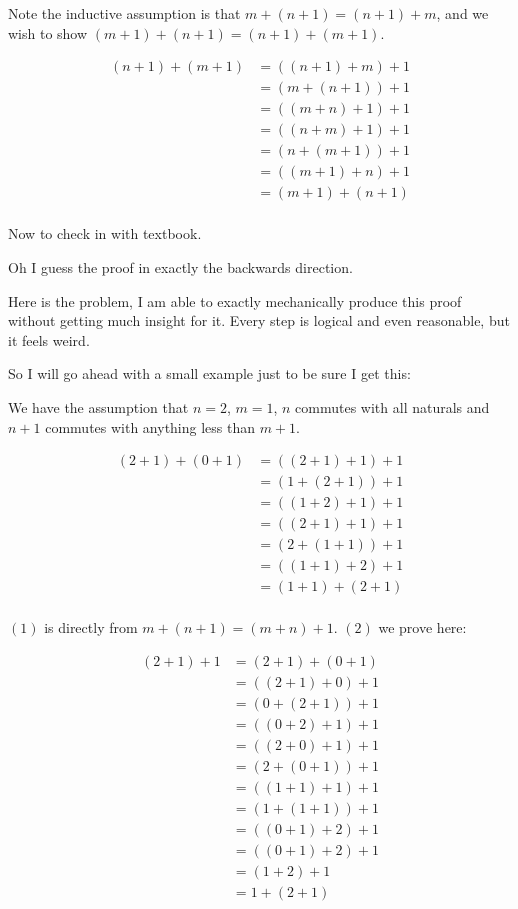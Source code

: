 \documentclass{article}
\begin{document}
\begin{enumerate}
Note the inductive assumption is that $m + (n + 1) = (n + 1) + m$, and we wish to show $(m + 1) + (n + 1) = (n + 1) + (m + 1)$.

\begin{align*}
	(n + 1) + (m + 1) &= ((n + 1) + m) + 1\\
	&= (m + (n + 1)) + 1\\
	&= ((m + n) + 1) + 1\\
	&= ((n + m) + 1) + 1\\
	&= (n + (m + 1)) + 1\\
	&= ((m + 1) + n) + 1\\
	&= (m + 1) + (n + 1)\\
\end{align*}

Now to check in with textbook.

Oh I guess the proof in exactly the backwards direction. 

Here is the problem, I am able to exactly mechanically produce this proof without getting much insight for it. Every step is logical and even reasonable, but it feels weird.

So I will go ahead with a small example just to be sure I get this:

We have the assumption that $n = 2$, $m = 1$, $n$ commutes with all naturals and $n + 1$ commutes with anything less than $m + 1$.

\begin{align}
	(2 + 1) + (0 + 1) &= ((2 + 1) + 1) + 1\\
	&= (1 + (2 + 1)) + 1\\
	&= ((1 + 2) + 1) + 1\\
	&= ((2 + 1) + 1) + 1\\
	&= (2 + (1 + 1)) + 1\\
	&= ((1 + 1) + 2) + 1\\
	&= (1 + 1) + (2 + 1)\\
\end{align}

$(1)$ is directly from $m + (n + 1) = (m + n) + 1$. $(2)$ we prove here:

\begin{align*}
	(2 + 1) + 1 &= (2 + 1) + (0 + 1)\\
	&= ((2 + 1) + 0) + 1\\
	&= (0 + (2 + 1)) + 1\\
	&= ((0 + 2) + 1) + 1\\
	&= ((2 + 0) + 1) + 1\\
	&= (2 + (0 + 1)) + 1\\
	&= ((1 + 1) + 1) + 1\\
	&= (1 + (1 + 1)) + 1\\
	&= ((0 + 1) + 2) + 1\\
	&= ((0 + 1) + 2) + 1\\
	&= (1 + 2) + 1\\
	&= 1 + (2 + 1)\\
\end{align*}


\end{enumerate}
\end{document}
